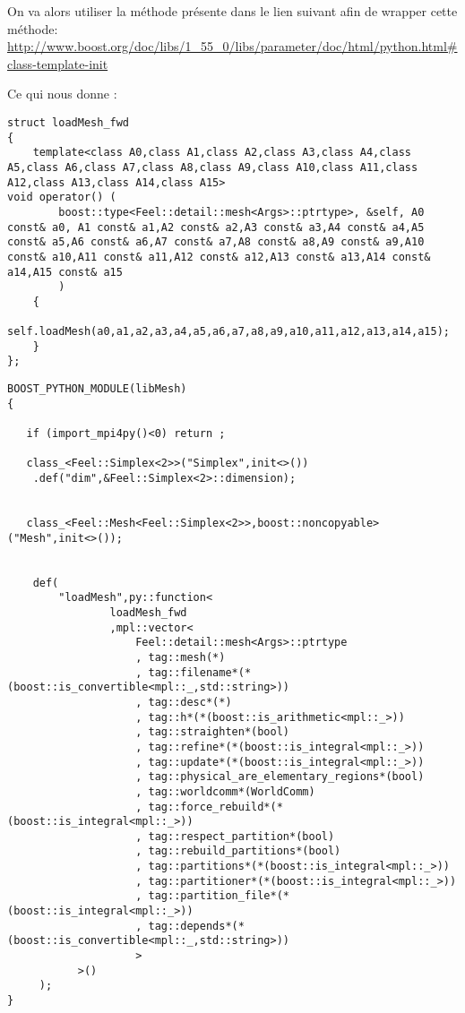 \documentclass[12pt]{article}
\begin{document}
On va alors utiliser la méthode présente dans le lien suivant afin de wrapper cette méthode:
\url{http://www.boost.org/doc/libs/1_55_0/libs/parameter/doc/html/python.html#class-template-init}

Ce qui nous donne :
\begin{lstlisting}
struct loadMesh_fwd
{
    template<class A0,class A1,class A2,class A3,class A4,class A5,class A6,class A7,class A8,class A9,class A10,class A11,class A12,class A13,class A14,class A15>
void operator() ( 
        boost::type<Feel::detail::mesh<Args>::ptrtype>, &self, A0 const& a0, A1 const& a1,A2 const& a2,A3 const& a3,A4 const& a4,A5 const& a5,A6 const& a6,A7 const& a7,A8 const& a8,A9 const& a9,A10 const& a10,A11 const& a11,A12 const& a12,A13 const& a13,A14 const& a14,A15 const& a15
        )
    {
        self.loadMesh(a0,a1,a2,a3,a4,a5,a6,a7,a8,a9,a10,a11,a12,a13,a14,a15);
    }
};
\end{lstlisting}

\newpage

\begin{lstlisting}
BOOST_PYTHON_MODULE(libMesh)
{
   
   if (import_mpi4py()<0) return ;
       
   class_<Feel::Simplex<2>>("Simplex",init<>())
    .def("dim",&Feel::Simplex<2>::dimension);
   
   
   class_<Feel::Mesh<Feel::Simplex<2>>,boost::noncopyable>("Mesh",init<>());

    
    def(
        "loadMesh",py::function<
                loadMesh_fwd
                ,mpl::vector<
                    Feel::detail::mesh<Args>::ptrtype
                    , tag::mesh(*)
                    , tag::filename*(*(boost::is_convertible<mpl::_,std::string>))
                    , tag::desc*(*)
                    , tag::h*(*(boost::is_arithmetic<mpl::_>))
                    , tag::straighten*(bool)
                    , tag::refine*(*(boost::is_integral<mpl::_>))
                    , tag::update*(*(boost::is_integral<mpl::_>))
                    , tag::physical_are_elementary_regions*(bool)
                    , tag::worldcomm*(WorldComm)
                    , tag::force_rebuild*(*(boost::is_integral<mpl::_>))
                    , tag::respect_partition*(bool)
                    , tag::rebuild_partitions*(bool)
                    , tag::partitions*(*(boost::is_integral<mpl::_>))
                    , tag::partitioner*(*(boost::is_integral<mpl::_>))
                    , tag::partition_file*(*(boost::is_integral<mpl::_>))
                    , tag::depends*(*(boost::is_convertible<mpl::_,std::string>))
                    >
           >()
     );
}
\end{lstlisting}
\end{document}
